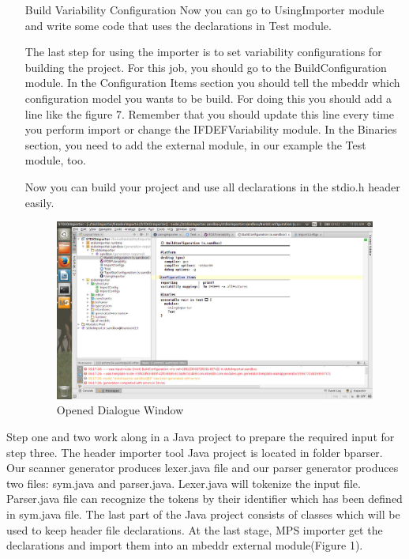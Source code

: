 \documentclass{article}
\begin{document}
\begin{itemize}
\item[Build Variability Configuration]
Now you can go to UsingImporter module and write some code that uses the declarations in Test module.

The last step for using the importer is to set variability configurations for building the project. For this job, you should go to the BuildConfiguration module. In the Configuration Items section you should tell the mbeddr which configuration model you wants to be build. For doing this you should add a line like the figure 7. Remember that you should update this line every time you perform import or change the IFDEFVariability module. In the Binaries section, you need to add the external module, in our example the Test module, too.

Now you can build your project and use all declarations in the stdio.h header easily.

\begin{figure}[ht]
\caption{Opened Dialogue Window}
\centering
\includegraphics[scale=0.3]{buildsett.jpg}
\end{figure}

\end{itemize}



Step one and two work along in a Java project to prepare the required input for step three. The header importer tool Java project is located in folder bparser. Our scanner generator produces lexer.java file and our parser generator produces two files: sym.java and parser.java. Lexer.java will tokenize the input file. Parser.java file can recognize the tokens by their identifier which has been defined in sym.java file. The last part of the Java project consists of classes which will be used to keep header file declarations. At the last stage, MPS importer get the declarations and import them into an mbeddr external module(Figure 1).
\end{document}
